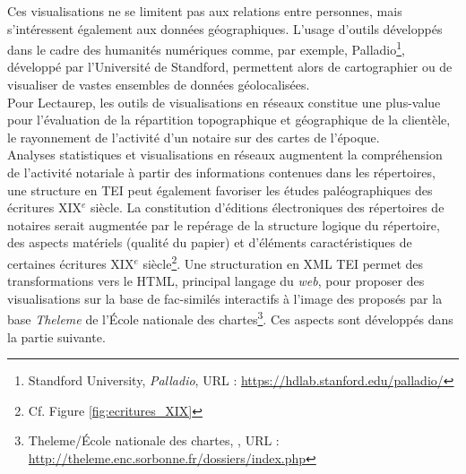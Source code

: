 Ces visualisations ne se limitent pas aux relations entre personnes, mais s'intéressent également aux données géographiques. L'usage d'outils développés dans le cadre des humanités numériques comme, par exemple, Palladio\footnote{Standford University, \textit{Palladio}, URL :  \url{https://hdlab.stanford.edu/palladio/}}, développé par l'Université de Standford, permettent alors de cartographier ou de visualiser de vastes ensembles de données géolocalisées.\\

Pour Lectaurep, les outils de visualisations en réseaux constitue une plus-value pour l'évaluation de la répartition topographique et géographique de la clientèle, le rayonnement de l'activité d'un notaire sur des cartes de l'époque.\\

Analyses statistiques et visualisations en réseaux augmentent la compréhension de l'activité notariale à partir des informations contenues dans les répertoires, une structure en TEI peut également favoriser les études paléographiques des écritures XIX$^{e}$ siècle. La constitution d'éditions électroniques des répertoires de notaires serait augmentée par le repérage de la structure logique du répertoire, des aspects matériels (qualité du papier) et d'éléments caractéristiques de certaines écritures XIX$^{e}$ siècle\footnote{Cf. Figure \ref{fig:ecritures_XIX}}. Une structuration en XML TEI permet des transformations vers le HTML, principal langage du \textit{web}, pour proposer des visualisations sur la base de fac-similés interactifs à l'image des  proposés par la base \textit{Theleme} de l'École nationale des chartes\footnote{Theleme/École nationale des chartes, , URL : \url{http://theleme.enc.sorbonne.fr/dossiers/index.php}}. Ces aspects sont développés dans la partie suivante.
\newpage
\thispagestyle{empty}

